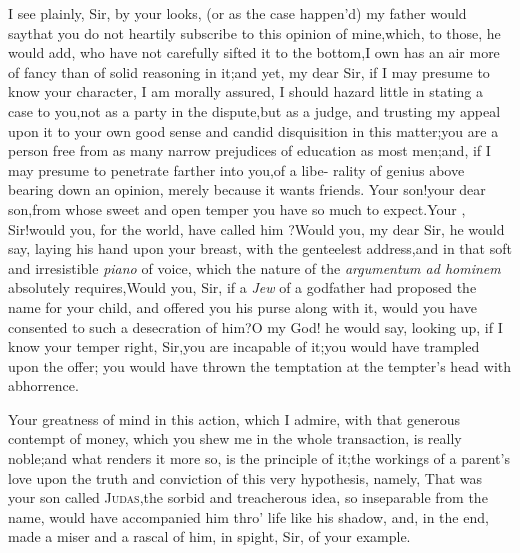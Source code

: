 \documentclass{article}
\begin{document}
I see plainly, Sir, by your looks, (or as the case happen’d) my
father would say\tsk  that you do not heartily subscribe to this
opinion of mine,\tsk  which, to those, he would add, who have not
carefully sifted it to the bottom,\tsk  I own has an air more of
fancy than of solid reasoning in it;\tsh  and yet, my dear
Sir, if I may presume to know your character, I am morally assured,
I should hazard little in stating a case to you,\tsk not as a party in
the dispute,\tsk  but as a judge, and trusting my appeal upon it
to your own good sense and candid disquisition in this
matter;\tsh  you are a person free from as many narrow
prejudices of education as most men;\tsk  and, if I may presume to
penetrate farther into you,\tsk  of a libe- rality of genius above
bearing down an opinion, merely because it wants friends. Your
son!\tsk  your dear son,\tsk  from whose sweet and open temper
you have so much to expect.\tsk  Your ,
Sir!\tsk  would you, for the world, have called him
?\tsk  Would you, my dear Sir, he would say,
laying his hand upon your breast, with the genteelest
address,\tsk  and in that soft and irresistible \textit{piano} of
voice, which the nature of the \textit{argumentum ad hominem}
absolutely requires,\tsk  Would you, Sir, if a \textit{Jew} of a
godfather had proposed the name for your child, and offered you his
purse along with it, would you have consented to such a desecration
of him?\tsh  O my God! he would say, looking up, if I know
your temper right, Sir,\tsk  you are incapable of
it;\tsh  you would have trampled upon the offer;\tsk{} you
would have thrown the temptation at the tempter’s head with
abhorrence.

Your greatness of mind in this action, which I admire, with that
generous contempt of money, which you shew me in the whole
transaction, is really noble;\tsk\break  and what renders it more so, is
the principle of it;\tsk  the workings of a parent’s love
upon the truth and conviction of this very hypothesis, namely, That
was your son called \textsc{Judas},\tsk  the sorbid and
treacherous idea, so inseparable from the name, would have
accompanied him thro’ life like his shadow, and, in the end, made
a miser and a rascal of him, in spight, Sir, of your example.
\end{document}

